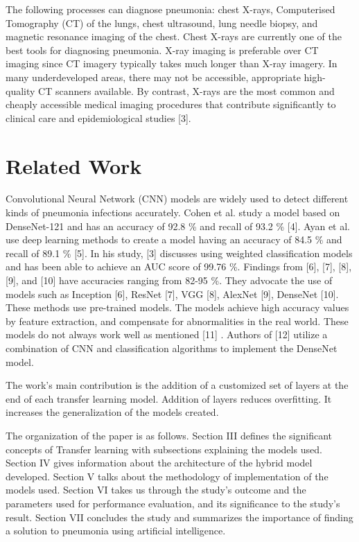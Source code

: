 \documentclass[conference]{IEEEtran}
\begin{document}
The following processes can diagnose pneumonia: chest X-rays, Computerised Tomography (CT) of the lungs, chest ultrasound, lung needle biopsy, and magnetic resonance imaging of the chest. Chest X-rays are currently one of the best tools for diagnosing pneumonia. X-ray imaging is preferable over CT imaging since CT imagery typically takes much longer than X-ray imagery. In many underdeveloped areas, there may not be accessible, appropriate high-quality CT scanners available. By contrast, X-rays are the most common and cheaply accessible medical imaging procedures that contribute significantly to clinical care and epidemiological studies [3].



\section{Related Work}


Convolutional Neural Network (CNN) models are widely used to detect different kinds of pneumonia infections accurately. Cohen et al. study a model based on DenseNet-121 and has an accuracy of 92.8 \% and recall of 93.2 \% [4]. Ayan et al. use deep learning methods to create a model having an accuracy of 84.5 \% and recall of 89.1 \% [5]. In his study, [3] discusses using weighted classification models and has been able to achieve an AUC score of 99.76 \%. Findings from [6], [7], [8], [9], and [10] have accuracies ranging from 82-95 \%. They advocate the use of models such as Inception [6], ResNet [7], VGG [8], AlexNet [9],  DenseNet [10]. These methods use pre-trained models. The models achieve high accuracy values by feature extraction, and compensate for abnormalities in the real world. These models  do not always work well as mentioned [11] . Authors of [12] utilize a combination of CNN and classification algorithms to implement the DenseNet model.

The work's main contribution is the addition of a customized set of layers at the end of each transfer learning model. Addition of layers reduces overfitting. It increases the generalization of the models created.

The organization of the paper is as follows. Section III defines the significant concepts of Transfer learning with subsections explaining the models used. Section IV gives information about the architecture of the hybrid model developed. Section V talks about the methodology of implementation of the models used. Section VI takes us through the study’s outcome and the parameters used for performance evaluation, and its significance to the study’s result. Section VII concludes the study and summarizes the importance of finding a solution to pneumonia using artificial intelligence.
\end{document}
